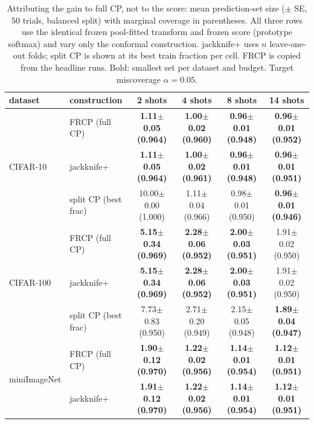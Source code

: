 \begin{table}[t]
\centering
\small
\caption{Attributing the gain to full CP, not to the score: mean prediction-set size ($\pm$ SE, 50 trials, balanced split) with marginal coverage in parentheses. All three rows use the identical frozen pool-fitted transform and frozen score (prototype softmax) and vary only the conformal construction. jackknife+ uses $n$ leave-one-out folds; split CP is shown at its best train fraction per cell. FRCP is copied from the headline runs. Bold: smallest set per dataset and budget. Target miscoverage $\alpha=0.05$.}
\label{tab:attrib-a005}
\begin{tabular}{llcccc}
\toprule
dataset & construction & 2 shots & 4 shots & 8 shots & 14 shots\\
\midrule
\multirow{3}{*}{CIFAR-10} & FRCP (full CP) & \textbf{1.11$\pm$0.05 {\scriptsize(0.964)}} & \textbf{1.00$\pm$0.02 {\scriptsize(0.960)}} & \textbf{0.96$\pm$0.01 {\scriptsize(0.948)}} & \textbf{0.96$\pm$0.01 {\scriptsize(0.952)}}\\
 & jackknife+ & \textbf{1.11$\pm$0.05 {\scriptsize(0.964)}} & \textbf{1.00$\pm$0.02 {\scriptsize(0.961)}} & \textbf{0.96$\pm$0.01 {\scriptsize(0.948)}} & \textbf{0.96$\pm$0.01 {\scriptsize(0.951)}}\\
 & split CP (best frac) & 10.00$\pm$0.00 {\scriptsize(1.000)} & 1.11$\pm$0.04 {\scriptsize(0.966)} & 0.98$\pm$0.01 {\scriptsize(0.950)} & \textbf{0.96$\pm$0.01 {\scriptsize(0.946)}}\\
\midrule
\multirow{3}{*}{CIFAR-100} & FRCP (full CP) & \textbf{5.15$\pm$0.34 {\scriptsize(0.969)}} & \textbf{2.28$\pm$0.06 {\scriptsize(0.952)}} & \textbf{2.00$\pm$0.03 {\scriptsize(0.951)}} & 1.91$\pm$0.02 {\scriptsize(0.950)}\\
 & jackknife+ & \textbf{5.15$\pm$0.34 {\scriptsize(0.969)}} & \textbf{2.28$\pm$0.06 {\scriptsize(0.952)}} & \textbf{2.00$\pm$0.03 {\scriptsize(0.951)}} & 1.91$\pm$0.02 {\scriptsize(0.950)}\\
 & split CP (best frac) & 7.73$\pm$0.83 {\scriptsize(0.950)} & 2.71$\pm$0.20 {\scriptsize(0.949)} & 2.15$\pm$0.05 {\scriptsize(0.948)} & \textbf{1.89$\pm$0.04 {\scriptsize(0.947)}}\\
\midrule
\multirow{3}{*}{miniImageNet} & FRCP (full CP) & \textbf{1.90$\pm$0.12 {\scriptsize(0.970)}} & \textbf{1.22$\pm$0.02 {\scriptsize(0.956)}} & \textbf{1.14$\pm$0.01 {\scriptsize(0.954)}} & \textbf{1.12$\pm$0.01 {\scriptsize(0.951)}}\\
 & jackknife+ & \textbf{1.91$\pm$0.12 {\scriptsize(0.970)}} & \textbf{1.22$\pm$0.02 {\scriptsize(0.956)}} & \textbf{1.14$\pm$0.01 {\scriptsize(0.954)}} & \textbf{1.12$\pm$0.01 {\scriptsize(0.951)}}\\

\end{tabular}
\end{table}
